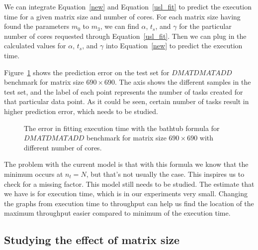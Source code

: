 \vspace{\baselineskip}	
We can integrate Equation~\ref{new} and Equation~\ref{usl_fit} to predict the execution time for a given matrix size and number of cores.
For each matrix size having found the parameters $m_0$ to $m_3$, we can find $\alpha$, $t_s$, and $\gamma$ for the particular number of cores requested through Equation~\ref{usl_fit}. Then we can plug in the calculated values for $\alpha$, $t_s$, and $\gamma$ into Equation~\ref{new} to predict the execution time.

Figure~\ref{fig25} shows the prediction error on the test set for $DMATDMATADD$ benchmark for matrix size $690\times690$. The axis shows the different samples in the test set, and the label of each point represents the number of tasks created for that particular data point. As it could be seen, certain number of tasks result in higher prediction error, which needs to be studied.


\vspace{\baselineskip}	
\begin{figure}[H]
	\caption{The error in fitting execution time with the bathtub formula for $DMATDMATADD$ benchmark for matrix size $690\times690$ with different number of cores.}	
	\label{fig25}
\end{figure}

The problem with the current model is that with this formula we know that the minimum occurs at $n_t=N$, but that's not usually the case. This inspires us to check for a missing factor. 
This model still needs to be studied. The estimate that we have is for execution time, which is in our experiments very small. Changing the graphs from execution time to throughput can help us find the location of the maximum throughput easier compared to minimum of the execution time.


\subsection{Studying the effect of matrix size}

